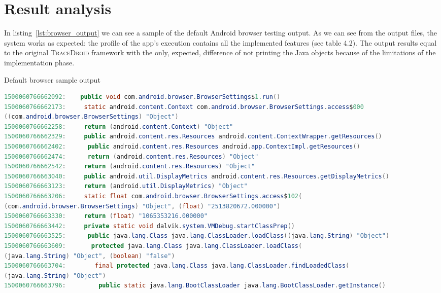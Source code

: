 \section{Result analysis}
\label{sec:result_analysis}

In listing~\ref{lst:browser_output} we can see a sample of the default Android browser
testing output. As we can see from the output files, the system works
as expected: the profile of the app's execution contains all the
implemented features (see table 4.2). The output results equal to the
original \textsc{TraceDroid} framework with the only, expected, difference of
not printing the Java objects because of the limitations of the
implementation phase.

\begin{listing}[!h]
  \begin{adjustwidth}{-9em}{-9em}
    \caption{Default browser sample output}
    \label{lst:browser_output}
    \begin{lstlisting}[language=Java]
1500060766662092:    public void com.android.browser.BrowserSettings$1.run()
1500060766662173:     static android.content.Context com.android.browser.BrowserSettings.access$000
((com.android.browser.BrowserSettings) "Object")
1500060766662258:     return (android.content.Context) "Object"
1500060766662329:     public android.content.res.Resources android.content.ContextWrapper.getResources()
1500060766662402:      public android.content.res.Resources android.app.ContextImpl.getResources()
1500060766662474:      return (android.content.res.Resources) "Object"
1500060766662542:     return (android.content.res.Resources) "Object"
1500060766663040:     public android.util.DisplayMetrics android.content.res.Resources.getDisplayMetrics()
1500060766663123:     return (android.util.DisplayMetrics) "Object"
1500060766663206:     static float com.android.browser.BrowserSettings.access$102(
(com.android.browser.BrowserSettings) "Object", (float) "2513820672.000000")
1500060766663330:     return (float) "1065353216.000000"
1500060766663442:     private static void dalvik.system.VMDebug.startClassPrep()
1500060766663525:      public java.lang.Class java.lang.ClassLoader.loadClass((java.lang.String) "Object")
1500060766663609:       protected java.lang.Class java.lang.ClassLoader.loadClass(
(java.lang.String) "Object", (boolean) "false")
1500060766663704:        final protected java.lang.Class java.lang.ClassLoader.findLoadedClass(
(java.lang.String) "Object")
1500060766663796:         public static java.lang.BootClassLoader java.lang.BootClassLoader.getInstance()

\end{lstlisting}
\end{adjustwidth}
\end{listing}
